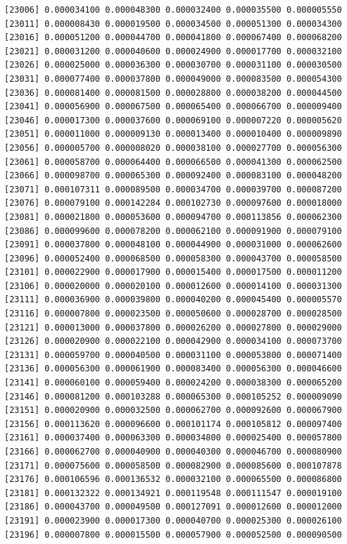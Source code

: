 \documentclass[]{article}
\begin{document}
\begin{verbatim}
[23006] 0.000034100 0.000048300 0.000032400 0.000035500 0.000005550
[23011] 0.000008430 0.000019500 0.000034500 0.000051300 0.000034300
[23016] 0.000051200 0.000044700 0.000041800 0.000067400 0.000068200
[23021] 0.000031200 0.000040600 0.000024900 0.000017700 0.000032100
[23026] 0.000025000 0.000036300 0.000030700 0.000031100 0.000030500
[23031] 0.000077400 0.000037800 0.000049000 0.000083500 0.000054300
[23036] 0.000081400 0.000081500 0.000028800 0.000038200 0.000044500
[23041] 0.000056900 0.000067500 0.000065400 0.000066700 0.000009400
[23046] 0.000017300 0.000037600 0.000069100 0.000007220 0.000005620
[23051] 0.000011000 0.000009130 0.000013400 0.000010400 0.000009890
[23056] 0.000005700 0.000008020 0.000038100 0.000027700 0.000056300
[23061] 0.000058700 0.000064400 0.000066500 0.000041300 0.000062500
[23066] 0.000098700 0.000065300 0.000092400 0.000083100 0.000048200
[23071] 0.000107311 0.000089500 0.000034700 0.000039700 0.000087200
[23076] 0.000079100 0.000142284 0.000102730 0.000097600 0.000018000
[23081] 0.000021800 0.000053600 0.000094700 0.000113856 0.000062300
[23086] 0.000099600 0.000078200 0.000062100 0.000091900 0.000079100
[23091] 0.000037800 0.000048100 0.000044900 0.000031000 0.000062600
[23096] 0.000052400 0.000068500 0.000058300 0.000043700 0.000058500
[23101] 0.000022900 0.000017900 0.000015400 0.000017500 0.000011200
[23106] 0.000020000 0.000020100 0.000012600 0.000014100 0.000031300
[23111] 0.000036900 0.000039800 0.000040200 0.000045400 0.000005570
[23116] 0.000007800 0.000023500 0.000050600 0.000028700 0.000028500
[23121] 0.000013000 0.000037800 0.000026200 0.000027800 0.000029000
[23126] 0.000020900 0.000022100 0.000042900 0.000034100 0.000073700
[23131] 0.000059700 0.000040500 0.000031100 0.000053800 0.000071400
[23136] 0.000056300 0.000061900 0.000083400 0.000056300 0.000046600
[23141] 0.000060100 0.000059400 0.000024200 0.000038300 0.000065200
[23146] 0.000081200 0.000103288 0.000065300 0.000105252 0.000009090
[23151] 0.000020900 0.000032500 0.000062700 0.000092600 0.000067900
[23156] 0.000113620 0.000096600 0.000101174 0.000105812 0.000097400
[23161] 0.000037400 0.000063300 0.000034800 0.000025400 0.000057800
[23166] 0.000062700 0.000040900 0.000040300 0.000046700 0.000080900
[23171] 0.000075600 0.000058500 0.000082900 0.000085600 0.000107878
[23176] 0.000106596 0.000136532 0.000032100 0.000065500 0.000086800
[23181] 0.000132322 0.000134921 0.000119548 0.000111547 0.000019100
[23186] 0.000043700 0.000049500 0.000127091 0.000012600 0.000012000
[23191] 0.000023900 0.000017300 0.000040700 0.000025300 0.000026100
[23196] 0.000007800 0.000015500 0.000057900 0.000052500 0.000090500

\end{verbatim}
\end{document}
